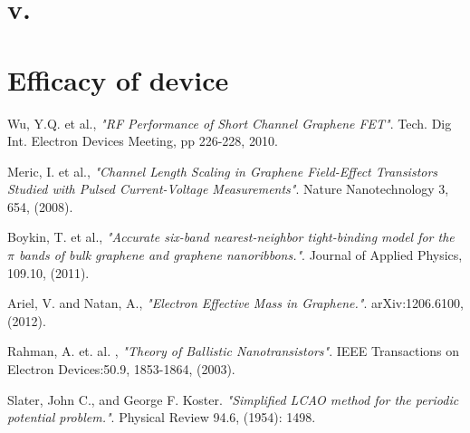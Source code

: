 \documentclass[11pt]{article}
\begin{document}
\section*{v.}

\section*{Efficacy of device}

\begin{thebibliography}{9}

  Wu, Y.Q. et al.,
  \textit{"RF Performance of Short Channel Graphene FET"}.
  Tech. Dig Int. Electron Devices Meeting,
  pp 226-228,
  2010.
  
  Meric, I. et al.,
  \textit{"Channel Length Scaling in Graphene Field-Effect Transistors Studied with Pulsed Current-Voltage Measurements"}.
  Nature Nanotechnology 3,
  654,
  (2008).
  
  Boykin, T. et al.,
  \textit{"Accurate six-band nearest-neighbor tight-binding model for the $\pi$ bands of bulk graphene and graphene nanoribbons."}.
  Journal of Applied Physics,
  109.10,
  (2011).
  
  Ariel, V. and Natan, A.,
  \textit{"Electron Effective Mass in Graphene."}.
  arXiv:1206.6100,
  (2012).
  
  Rahman, A. et. al. ,
  \textit{"Theory of Ballistic Nanotransistors"}.
   IEEE Transactions on Electron Devices:50.9,
   1853-1864,
    (2003).
    
  Slater, John C., and George F. Koster. 
  \textit{"Simplified LCAO method for the periodic potential problem."}.
   Physical Review 94.6,
    (1954): 1498.
  
\end{thebibliography}
\end{document}
